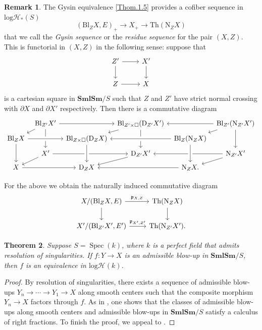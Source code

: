 \documentclass[11pt, a4paper]{amsart}
\newtheorem{thm}{Theorem}[subsection]
\theoremstyle{definition}
\newtheorem{rmk}[thm]{Remark}
\numberwithin{equation}{subsection}
\newcommand{\SmlSm}{\mathbf{SmlSm}}
\providecommand{\Spec}[1]{\operatorname{Spec}(#1)} 	%
\newcommand{\Blow}{{\mathrm{Bl}}}
\newcommand{\Normal}{{\mathrm{N}}}
\newcommand{\Deform}{{\mathrm{D}}}
\newcommand{\Thom}{\mathrm{Th}}
\newcommand{\boxx}{\square}
\newcommand{\inflogH}{\mathrm{log}\mathcal{H}}
\newcommand{\inflogHpt}{\mathrm{log}\mathcal{H}_\ast}
\begin{document}
\begin{rmk}\label{rmk:Gysin}The Gysin equivalence \eqref{Thom.1.5} provides a cofiber sequence in $\inflogHpt(S)$
\[
(\Blow_Z X,E)_+ \to X_+ \to \Thom(\Normal_Z X)
\]
that we call the \emph{Gysin sequence} or the \emph{residue sequence}  for the pair $(X,Z)$. This is functorial in $(X,Z)$ in the following sense:
suppose that
\[
\begin{tikzcd}
Z'\ar[r]\ar[d]&
X'\ar[d]
\\
Z\ar[r]&
X
\end{tikzcd}
\]
is a cartesian square in $\SmlSm/S$ such that $Z$ and $Z'$ have strict normal crossing with $\partial X$ and $\partial X'$ respectively.
Then there is a commutative diagram
\begin{equation}
\label{Thom.1.8}
\begin{tikzcd}[row sep=tiny, column sep=tiny]
&
\Blow_{Z'} X'\ar[rr]\ar[dd]\ar[ld]&&
\Blow_{Z'\times \boxx}(\Deform_{Z'} X')\ar[rr,leftarrow]\ar[dd]\ar[ld]&&
\Blow_{Z'} (\Normal_{Z'} X')\ar[dd]\ar[ld]
\\
\Blow_Z X\ar[rr,crossing over]\ar[dd]&&
\Blow_{Z\times \boxx}(\Deform_Z X)\ar[rr,leftarrow,crossing over]&&
\Blow_Z (\Normal_Z X)
\\
&
X'\ar[rr]\ar[ld]&&
\Deform_{Z'} X'\ar[rr,leftarrow]\ar[ld]&&
\Normal_{Z'} X'\ar[ld]
\\
X\ar[rr]&&
\Deform_Z X\ar[rr,leftarrow]\ar[uu,crossing over,leftarrow]&&
\Normal_Z X.\ar[uu,crossing over,leftarrow]
\end{tikzcd}
\end{equation}

For the above we obtain the naturally induced commutative diagram
\begin{equation}
\label{Thom.1.7}
\begin{tikzcd}
X/(\Blow_Z X,E)\ar[d]\ar[r,"\mathfrak{p}_{X,Z}"]&
\Thom(\Normal_Z X)\ar[d]
\\
X'/(\Blow_{Z'} X',E')\ar[r,"\mathfrak{p}_{X',Z'}"]&
\Thom(\Normal_{Z'}X').
\end{tikzcd}
\end{equation}
\end{rmk}



\begin{thm}
\label{ProplogSH.3}
Suppose $S=\Spec{k}$,
where $k$ is a perfect field that admits resolution of singularities.
If $f\colon Y\to X$ is an admissible blow-up in $\SmlSm/S$,
then $f$ is an equivalence in $\inflogH(k)$.
\end{thm}
\begin{proof}
By resolution of singularities,
there exists a sequence of admissible blow-ups $Y_n\to \cdots \to Y_1\to X$ along smooth centers such that the composite morphism $Y_n\to X$ factors through $f$.
As in \cite[Propositions 7.6.4,  7.6.6]{logDM},
one shows that the classes of admissible blow-ups along smooth centers and 
admissible blow-ups in $\SmlSm/S$ satisfy a calculus of right fractions.
To finish the proof, 
we appeal to \cite[Lemma C.2.1]{logDM}.
\end{proof}
\end{document}
